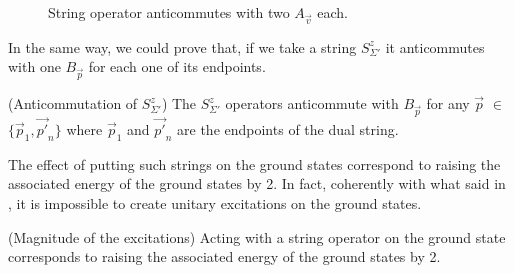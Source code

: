 \documentclass{Configuration_Files/PoliMi3i_thesis}
\begin{document}
\begin{figure}
\begin{center}
	\end{center}
	
	\caption{String operator anticommutes with two $A_{\vec{v}}$ each.}
	\label{fig:Av&string}
\end{figure}


In the same way, we could prove that, if we take a string $S^z_{\Sigma'}$ it anticommutes with one $B_{\vec{p}} $ for each one of its endpoints.

\begin{proposition}(Anticommutation of $S^z_{\Sigma'}$)
	The $S^z_{\Sigma'}$ operators anticommute with $B_{\vec{p}}$ for any $\vec{p}$ $\in$ $\{\vec{p}_1, \vec{p'}_n \}$ where $ \vec{p}_1$ and $ \vec{p'}_n$ are the endpoints of the dual string.
\end{proposition}

The effect of putting such strings on the ground states correspond to raising the associated energy of the ground states by 2. In fact, coherently with what said in {\cite{Her20}}, it is impossible to create unitary excitations on the ground states.

\begin{proposition}(Magnitude of the excitations)
	Acting with a string operator on the ground state corresponds to raising the associated energy of the ground states by 2.
\end{proposition}
\end{document}
